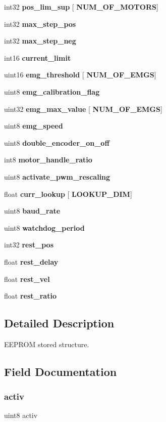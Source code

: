 \begin{DoxyCompactItemize}
\item 
int32 \textbf{ pos\+\_\+lim\+\_\+sup} [\textbf{ N\+U\+M\+\_\+\+O\+F\+\_\+\+M\+O\+T\+O\+RS}]
\item 
int32 \textbf{ max\+\_\+step\+\_\+pos}
\item 
int32 \textbf{ max\+\_\+step\+\_\+neg}
\item 
int16 \textbf{ current\+\_\+limit}
\item 
uint16 \textbf{ emg\+\_\+threshold} [\textbf{ N\+U\+M\+\_\+\+O\+F\+\_\+\+E\+M\+GS}]
\item 
uint8 \textbf{ emg\+\_\+calibration\+\_\+flag}
\item 
uint32 \textbf{ emg\+\_\+max\+\_\+value} [\textbf{ N\+U\+M\+\_\+\+O\+F\+\_\+\+E\+M\+GS}]
\item 
uint8 \textbf{ emg\+\_\+speed}
\item 
uint8 \textbf{ double\+\_\+encoder\+\_\+on\+\_\+off}
\item 
int8 \textbf{ motor\+\_\+handle\+\_\+ratio}
\item 
uint8 \textbf{ activate\+\_\+pwm\+\_\+rescaling}
\item 
float \textbf{ curr\+\_\+lookup} [\textbf{ L\+O\+O\+K\+U\+P\+\_\+\+D\+IM}]
\item 
uint8 \textbf{ baud\+\_\+rate}
\item 
uint8 \textbf{ watchdog\+\_\+period}
\item 
int32 \textbf{ rest\+\_\+pos}
\item 
float \textbf{ rest\+\_\+delay}
\item 
float \textbf{ rest\+\_\+vel}
\item 
float \textbf{ rest\+\_\+ratio}
\end{DoxyCompactItemize}


\subsection{Detailed Description}
E\+E\+P\+R\+OM stored structure. 



\subsection{Field Documentation}
\mbox{\label{structst__mem_a63bbebc1db55f43e0571006597a3488b}} 
\subsubsection{activ}
{\footnotesize\ttfamily uint8 activ}

